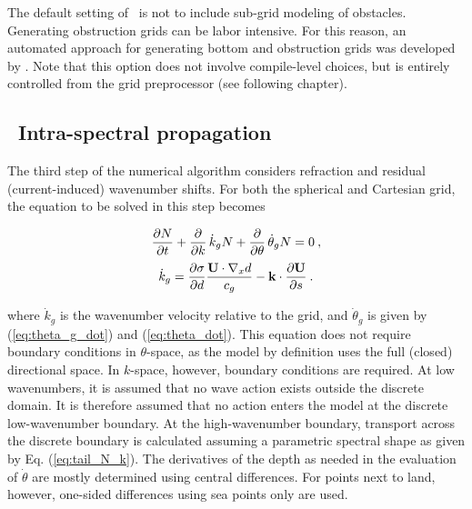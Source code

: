 The default setting of \ws\ is not to include sub-grid modeling of
obstacles. Generating obstruction grids can be labor intensive. For this
reason, an automated approach for generating bottom and obstruction grids was
developed by \cite{tol:MMAB07a, tol:OMOD08a}.  Note that this option does not
involve compile-level choices, but is entirely controlled from the grid
preprocessor (see following chapter).


\vssub
\subsection{~Intra-spectral propagation}
\vssub

The third step of the numerical algorithm considers refraction and residual
(current-induced) wavenumber shifts. For both the spherical and Cartesian
grid, the equation to be solved in this step becomes


\begin{equation}
\frac{\partial N}{\partial t} + \frac{\partial}{\partial k} \, \dot{k}_g N +
\frac{\partial}{\partial \theta} \, \dot{\theta}_g N = 0
\: , \label{eq:step_intra} \end{equation} \begin{equation}
\dot{k}_g  = \frac{\partial \sigma}{\partial d} 
    \frac{{\bf U} \cdot \nabla_x d}{c_g}  -
    {\bf k} \cdot \frac{\partial {\bf U}}{\partial s}
\: . \label{eq:k_dot_g} \end{equation}

\noindent
where $\dot{k}_g$ is the wavenumber velocity relative to the grid, and
$\dot{\theta}_g$ is given by (\ref{eq:theta_g_dot}) and (\ref{eq:theta_dot}).
This equation does not require boundary conditions in $\theta$-space, as the
model by definition uses the full (closed) directional space. In $k$-space,
however, boundary conditions are required. At low wavenumbers, it is assumed
that no wave action exists outside the discrete domain. It is therefore
assumed that no action enters the model at the discrete low-wavenumber
boundary. At the high-wavenumber boundary, transport across the discrete
boundary is calculated assuming a parametric spectral shape as given by
Eq. (\ref{eq:tail_N_k}). The derivatives of the depth as needed in the
evaluation of $\dot{\theta}$ are mostly determined using central
differences. For points next to land, however, one-sided differences using sea
points only are used.

